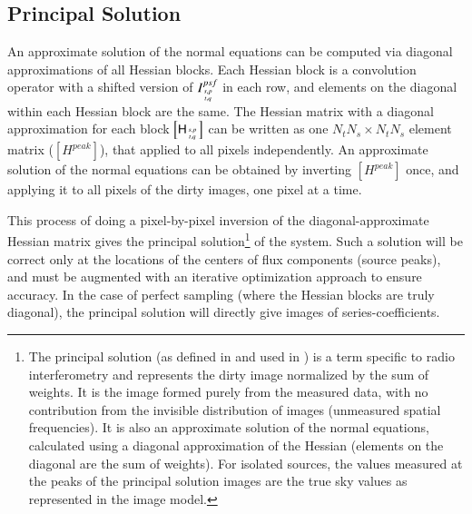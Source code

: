 \documentclass[structabstract]{stylefiles/aa}
\newcommand{\He}{{\tens{H}}}
\begin{document}
\subsection{Principal Solution}
An approximate solution of the normal equations can be computed via diagonal
approximations of all Hessian blocks.
Each Hessian block is a convolution operator with a shifted version of 
$I^{psf}_{{s,p}\atop{t,q}}$ in each row, and 
elements on the diagonal within each Hessian block are the same. 
The Hessian matrix with a diagonal approximation for each block $\left[\He_{{s,p}\atop{t,q}}\right]$ 
can be written as one $N_tN_s \times N_tN_s$ element matrix ($[H^{peak}]$), 
that applied to all pixels independently.  An approximate solution of the normal equations
can be obtained by inverting $[H^{peak}]$ once, and applying it to all pixels of the dirty
images, one pixel at a time.

This process of doing a pixel-by-pixel inversion of the diagonal-approximate 
Hessian matrix gives the
principal solution\footnote{The principal solution (as defined in \citet{BRACEWELL_ROBERTS} and used in 
\citet{DECONV_LECTURE}) is a term specific to radio interferometry
and represents the dirty image normalized by the sum of weights.  
It is the image formed purely from the measured data, with no contribution from the
invisible distribution of images (unmeasured spatial frequencies).
It is also an approximate solution of the normal equations, calculated using a diagonal
approximation of the Hessian (elements on the diagonal are the sum of weights).
For isolated sources, the values measured at the peaks of the
principal solution images are the true sky values as represented in the 
image model.
} of the system. 
%
%
%
Such a solution will be correct only at the locations of the centers
of flux components (source peaks), and must be augmented with an iterative optimization 
approach to ensure accuracy.  In the case of perfect sampling (where the Hessian blocks
are truly diagonal), the principal solution will directly give images
of series-coefficients.
\end{document}

